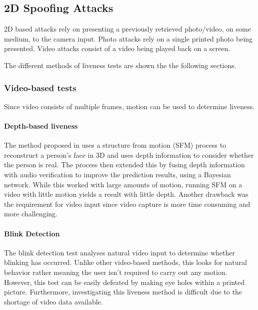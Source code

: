 \documentclass[12pt,a4paper]{article}
\begin{document}
    \subsection{2D Spoofing Attacks}
        2D based attacks rely on presenting a previously retrieved photo/video, on some medium, to the camera input. Photo attacks rely on a single printed photo being presented. Video attacks consist of a video being played back on a screen. \cite{FaceSpoofingAttacksStudy}
        
        The different methods of liveness tests are shown the the following sections.

        \subsubsection{Video-based tests}
        Since video consists of multiple frames, motion can be used to determine liveness. 

        \paragraph{Depth-based liveness}

        The method proposed in \cite{SFMClassifier} uses a structure from motion (SFM) process to reconstruct a person's face in 3D and uses depth information to consider whether the person is real. The process then extended this by fusing depth information with audio verification to improve the prediction results, using a Bayesian network. \cite{SFMClassifier} While this worked with large amounts of motion, running SFM on a video with little motion yields a result with little depth. Another drawback was the requirement for video input since video capture is more time consuming and more challenging.
        
        \paragraph{Blink Detection}
        The blink detection test analyses natural video input to determine whether blinking has occurred. Unlike other video-based methods, this looks for natural behavior rather meaning the user isn't required to carry out any motion. \cite{BlinkDetectionLivenessTest} 
        However, this test can be easily defeated by making eye holes within a printed picture. 
        Furthermore, investigating this liveness method is difficult due to the shortage of video data available.
    
\end{document}
